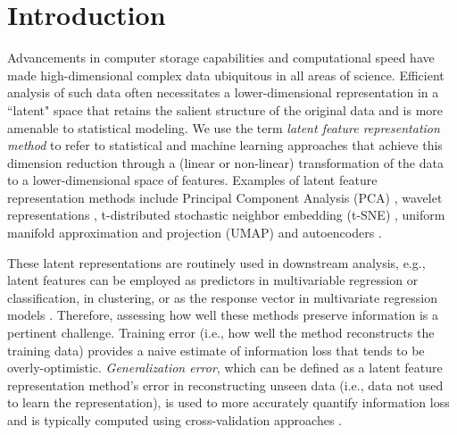 \section{Introduction}

Advancements in computer storage capabilities and computational speed have made high-dimensional complex data ubiquitous in all areas of science.
Efficient analysis of such data often necessitates a lower-dimensional representation in a ``latent" space that retains the salient structure of the original data and is more amenable to statistical modeling.
We use the term \emph{latent feature representation method} to refer to statistical and machine learning approaches that achieve this dimension reduction through a (linear or non-linear) transformation of the data to a lower-dimensional space of features.
Examples of latent feature representation methods include Principal Component Analysis (PCA) \parencite{hotelling_analysis_1933}, wavelet representations \parencite{daubechies_wavelet_1990}, t-distributed stochastic neighbor embedding (t-SNE) \parencite{maaten_visualizing_2008}, uniform manifold approximation and projection (UMAP) \parencite{mcinnes_umap_2020} and autoencoders \parencite{rumelhart_learning_1986}.

These latent representations are routinely used in downstream analysis, e.g., latent features can be employed as predictors in multivariable regression or classification, in clustering, or as the response vector in multivariate regression models \parencite{niu_dimensionality_2011,wang_role_2014, cook_fisher_2007}. 
Therefore, assessing how well these methods preserve information is a pertinent challenge.
Training error (i.e., how well the method reconstructs the training data) provides a naive estimate of information loss that tends to be overly-optimistic.
\emph{Generalization error}, which can be defined as a latent feature representation method's error in reconstructing unseen data (i.e., data not used to learn the representation), is used to more accurately quantify information loss and is typically computed using cross-validation approaches \parencite[see, e.g.,][]{becht_dimensionality_2019, bro_cross-validation_2008, wold_cross-validatory_1978, eastment_cross-validatory_1982,krzanowski_cross-validation_1987, minka_automatic_2000, rajan_bayesian_1994, camacho_cross-validation_2014, diana_cross-validation_2002, hubert_fast_2007, josse_selecting_2012, saccenti_use_2015}.

